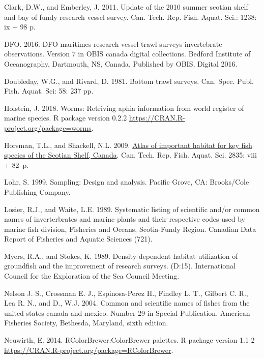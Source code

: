 \documentclass[12pt]{article}\usepackage[]{graphicx}\usepackage[]{color}
\begin{document}
\begin{CSLReferences}{1}{0}
\leavevmode\hypertarget{ref-ClarkEmberley2011}{}%
Clark, D.W., and Emberley, J. 2011. Update of the 2010 summer scotian shelf and bay of fundy research vessel survey. Can. Tech. Rep. Fish. Aquat. Sci.: 1238: ix + 98 p.

\leavevmode\hypertarget{ref-DFO:2016}{}%
DFO. 2016. DFO maritimes research vessel trawl surveys invertebrate observations. Version 7 in OBIS canada digital collections. Bedford Institute of Oceanography, Dartmouth, NS, Canada, Published by OBIS, Digital 2016.

\leavevmode\hypertarget{ref-DoubledayRivard1981}{}%
Doubleday, W.G., and Rivard, D. 1981. Bottom trawl surveys. Can. Spec. Publ. Fish. Aquat. Sci: 58: 237 pp.

\leavevmode\hypertarget{ref-R:package:worms}{}%
Holstein, J. 2018. Worms: Retriving aphia information from world register of marine species. R package version 0.2.2 \url{https://CRAN.R-project.org/package=worms}.

\leavevmode\hypertarget{ref-Horsman:atlas:2009}{}%
Horsman, T.L., and Shackell, N.L. 2009. \href{http://publications.gc.ca/site/eng/353896/publication.html}{Atlas of important habitat for key fish species of the {S}cotian {S}helf, {C}anada}. Can. Tech. Rep. Fish. Aquat. Sci. 2835: viii + 82~p.

\leavevmode\hypertarget{ref-Lohr1999}{}%
Lohr, S. 1999. Sampling: Design and analysis. Pacific Grove, CA: Brooks/Cole Publishing Company.

\leavevmode\hypertarget{ref-LosierWaite1989}{}%
Losier, R.J., and Waite, L.E. 1989. Systematic listing of scientific and/or common names of inverterbrates and marine plants and their respective codes used by marine fish division, {F}isheries and {O}ceans, {S}cotia-{F}undy {R}egion. Canadian Data Report of Fisheries and Aquatic Sciences (721).

\leavevmode\hypertarget{ref-Myers:Stokes:1989}{}%
Myers, R.A., and Stokes, K. 1989. Density-dependent habitat utilization of groundfish and the improvement of research surveys. (D:15). International Council for the Exploration of the Sea Council Meeting.

\leavevmode\hypertarget{ref-Nelsonetal:2004}{}%
Nelson J. S., Crossman E. J., Espinosa-Perez H., Findley L. T., Gilbert C. R., Lea R. N., and D., W.J. 2004. Common and scientific names of fishes from the united states canada and mexico. Number 29 in Special Publication. American Fisheries Society, Bethesda, Maryland, sixth edition.

\leavevmode\hypertarget{ref-R:package:RColorBrewer}{}%
Neuwirth, E. 2014. RColorBrewer:ColorBrewer palettes. R package version 1.1-2 \url{https://CRAN.R-project.org/package=RColorBrewer}.


\end{CSLReferences}
\end{document}
